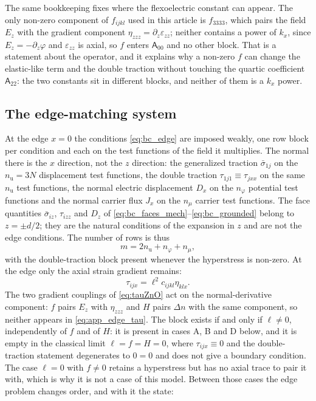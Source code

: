 The same bookkeeping fixes where the flexoelectric constant can appear.  The only
non-zero component of $f_{ijkl}$ used in this article is $f_{3333}$, which pairs
the field $E_z$ with the gradient component $\eta_{zzz}=\partial_z\varepsilon_{zz}$;
neither contains a power of $k_x$, since $E_z=-\partial_z\varphi$ and
$\varepsilon_{zz}$ is axial, so $f$ enters $\mathsf A_{00}$ and no other block.
That is a statement about the operator, and it explains why a non-zero $f$ can
change the elastic-like term and the double traction without touching the quartic
coefficient $\mathsf A_{22}$: the two constants sit in different blocks, and
neither of them is a $k_x$ power.

\subsection{The edge-matching system}

At the edge $x=0$ the conditions \eqref{eq:bc_edge} are imposed weakly, one row
block per condition and each on the test functions of the field it multiplies.
The normal there is the $x$ direction, not the $z$ direction: the generalized
traction $\bar\sigma_{1j}$ on the $n_{\mathrm u}=3N$ displacement test functions,
the double traction $\tau_{1j1}\equiv\tau_{jxx}$ on the same $n_{\mathrm u}$ test
functions, the normal electric displacement $D_x$ on the $n_\varphi$ potential
test functions and the normal carrier flux $J_x$ on the $n_\mu$ carrier test
functions.  The face quantities $\bar\sigma_{iz}$, $\tau_{izz}$ and $D_z$ of
\eqref{eq:bc_faces_mech}--\eqref{eq:bc_grounded} belong to $z=\pm d/2$; they are
the natural conditions of the expansion in $z$ and are not the edge conditions.
The number of rows is thus
\begin{equation*}
m=2n_{\mathrm u}+n_\varphi+n_\mu ,
\end{equation*}
with the double-traction block present whenever the hyperstress is non-zero.  At the edge only the axial strain gradient remains:
\begin{equation}
\label{eq:app_edge_tau}
\tau_{ijx}=\ell^{2}c_{ijkl}\eta_{klx} .
\end{equation}
The two gradient couplings of \eqref{eq:tauZnO} act on the normal-derivative
component: $f$ pairs $E_z$ with $\eta_{zzz}$ and $H$ pairs $\Delta n$ with the
same component, so neither appears in \eqref{eq:app_edge_tau}.  The block exists if and only if $\ell\neq0$, independently of $f$ and of $H$: it
is present in cases A, B and D below, and it is empty in the classical limit
$\ell=f=H=0$, where $\tau_{ijx}\equiv0$ and the double-traction statement
degenerates to $0=0$ and does not give a boundary condition.  The case $\ell=0$ with
$f\neq0$ retains a hyperstress but has no axial trace to pair it with, which is
why it is not a case of this model.  Between those cases the edge problem changes
order, and with it the state:

